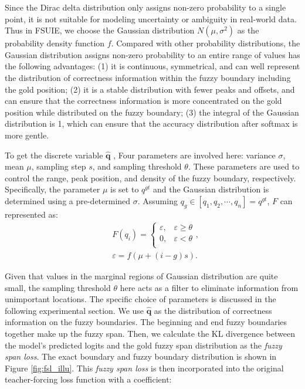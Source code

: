 \documentclass[11pt]{article}
\begin{document}
Since the Dirac delta distribution only assigns non-zero probability to a single point, it is not suitable for modeling uncertainty or ambiguity in real-world data. Thus in FSUIE, we choose the Gaussian distribution $N(\mu,\sigma^{2})$ as the probability density function $f$. 
Compared with other probability distributions, the Gaussian distribution assigns non-zero probability to an entire range of values has the following advantages: (1) it is continuous, symmetrical, and can well represent the distribution of correctness information within the fuzzy boundary including the gold position; (2) it is a stable distribution with fewer peaks and offsets, and can ensure that the correctness information is more concentrated on the gold position while distributed on the fuzzy boundary; (3) the integral of the Gaussian distribution is 1, which can ensure that the accuracy distribution after softmax is more gentle.



To get the discrete variable 
$\mathbf{\hat{q}}$
, Four parameters are involved here: variance $\sigma$, mean $\mu$, sampling step $s$, and sampling threshold $\theta$. These parameters are used to control the range, peak position, and density of the fuzzy boundary, respectively. Specifically,  the parameter $\mu$ is set to $q^{gt}$ and the Gaussian distribution is determined using a pre-determined $\sigma$. Assuming $q_{g}\in [q_{1}, q_{2}, \cdots, q_{n}] =q^{gt}$, $F$ can represented as:
\begin{equation}
    \begin{aligned}
    &F(q_{i})=\left\{\begin{array}{ll}
    \varepsilon, &\varepsilon \ge \theta \\
    0, &\varepsilon <\theta \\ 
    \end{array}\right.,\\
    &\varepsilon=f(\mu+(i-g)s).
    \end{aligned}
\end{equation}



Given that values in the marginal regions of Gaussian distribution are quite small, the sampling threshold $\theta$ here acts as a filter to eliminate information from unimportant locations.
The specific choice of parameters is discussed in the following experimental section.
We use 
$\mathbf{\hat{q}}$
as the distribution of correctness information on the fuzzy boundaries. The beginning and end fuzzy boundaries together make up the fuzzy span. Then, we calculate the KL divergence between the model's predicted logits and the gold fuzzy span distribution as the \textit{fuzzy span loss}. The exact boundary and fuzzy boundary distribution is shown in Figure \ref{fig:fsl_illu}. This \textit{fuzzy span loss} is then incorporated into the original teacher-forcing loss function with a coefficient:
\end{document}
